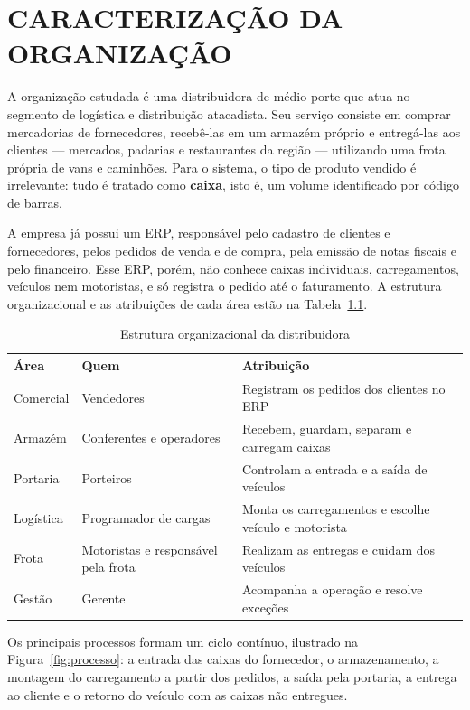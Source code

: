 \chapter{CARACTERIZAÇÃO DA ORGANIZAÇÃO}

A organização estudada é uma distribuidora de médio porte que atua no segmento de logística e distribuição atacadista. Seu serviço consiste em comprar mercadorias de fornecedores, recebê-las em um armazém próprio e entregá-las aos clientes --- mercados, padarias e restaurantes da região --- utilizando uma frota própria de vans e caminhões. Para o sistema, o tipo de produto vendido é irrelevante: tudo é tratado como \textbf{caixa}, isto é, um volume identificado por código de barras.

A empresa já possui um ERP, responsável pelo cadastro de clientes e fornecedores, pelos pedidos de venda e de compra, pela emissão de notas fiscais e pelo financeiro. Esse ERP, porém, não conhece caixas individuais, carregamentos, veículos nem motoristas, e só registra o pedido até o faturamento. A estrutura organizacional e as atribuições de cada área estão na Tabela~\ref{tab:areas}.

\begin{table}[htbp]
\centering
\caption{Estrutura organizacional da distribuidora}
\label{tab:areas}
\small
\begin{tabular}{|p{2.6cm}|p{4.4cm}|p{7.4cm}|}
\hline
\textbf{Área} & \textbf{Quem} & \textbf{Atribuição} \\ \hline
Comercial & Vendedores & Registram os pedidos dos clientes no ERP \\ \hline
Armazém & Conferentes e operadores & Recebem, guardam, separam e carregam caixas \\ \hline
Portaria & Porteiros & Controlam a entrada e a saída de veículos \\ \hline
Logística & Programador de cargas & Monta os carregamentos e escolhe veículo e motorista \\ \hline
Frota & Motoristas e responsável pela frota & Realizam as entregas e cuidam dos veículos \\ \hline
Gestão & Gerente & Acompanha a operação e resolve exceções \\ \hline
\end{tabular}
\end{table}

Os principais processos formam um ciclo contínuo, ilustrado na Figura~\ref{fig:processo}: a entrada das caixas do fornecedor, o armazenamento, a montagem do carregamento a partir dos pedidos, a saída pela portaria, a entrega ao cliente e o retorno do veículo com as caixas não entregues.

